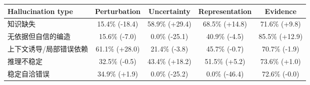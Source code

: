 \begin{tabular}{lcccc}
\toprule
Hallucination type & Perturbation & Uncertainty & Representation & Evidence \\
\midrule
知识缺失 & 15.4\% (-18.4) & 58.9\% (+29.4) & 68.5\% (+14.8) & 71.6\% (+9.8) \\
无依据但自信的编造 & 15.6\% (-7.0) & 0.0\% (-25.1) & 40.9\% (-4.5) & 85.5\% (+12.9) \\
上下文诱导/局部错误依赖 & 61.1\% (+28.0) & 21.4\% (-3.8) & 45.7\% (-0.7) & 70.7\% (-1.9) \\
推理不稳定 & 32.5\% (-0.5) & 43.4\% (+18.2) & 51.5\% (+5.2) & 73.6\% (+1.0) \\
稳定自洽错误 & 34.9\% (+1.9) & 0.0\% (-25.2) & 0.0\% (-46.4) & 72.6\% (-0.0) \\
\bottomrule
\end{tabular}
